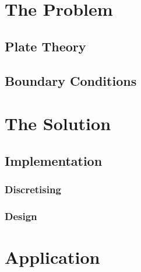 \section{The Problem}\label{the-problem-2}

\subsection{Plate Theory}\label{plate-theory}

\subsection{Boundary Conditions}\label{boundary-conditions}

\section{The Solution}\label{the-solution-1}

\subsection{Implementation}\label{implementation}

\subsubsection{Discretising}\label{discretising}
\subsubsection{Design}\label{design}

\section{Application}\label{application-1}

